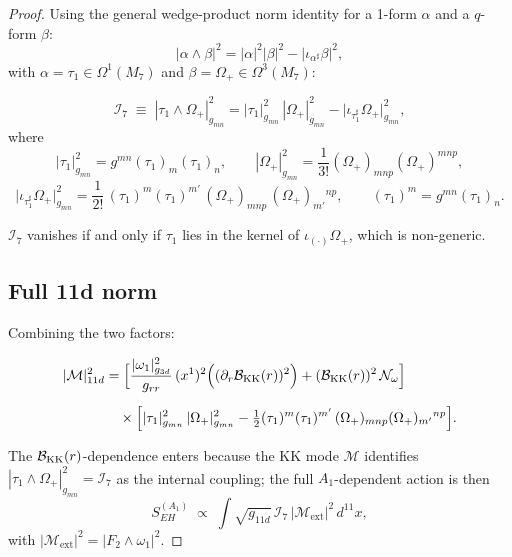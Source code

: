 \documentclass[a4paper,11pt,fleqn]{article}
\theoremstyle{plain}
\theoremstyle{definition}
\newcommand{\ta}{\tau}
\newcommand{\Nf}{{\cal B}_{\rm KK}(r)}
\newcommand{\gone}{g_{11d}}
\newcommand{\grr}{g_{rr}}
\newcommand{\iot}[1]{\iota_{#1}}
\newcommand{\Ical}{\mathcal{I}_7}
\begin{document}
\begin{proof}
\noindent
Using the general wedge-product norm identity for a 1-form $\alpha$
and a $q$-form $\beta$:
\[
  |\alpha\wedge\beta|^2 = |\alpha|^2|\beta|^2 - |\iot{\alpha^\sharp}\beta|^2,
\]
with $\alpha=\ta_1\in\Omega^1(M_7)$ and $\beta=\Omega_+\in\Omega^3(M_7)$:

\[
  \Ical
  \;\equiv\;
  |\ta_1\wedge\Omega_+|^2_{g_{mn}}
  = |\ta_1|^2_{g_{mn}}\,|\Omega_+|^2_{g_{mn}}
  - \bigl|\iot{\ta_1^\sharp}\Omega_+\bigr|^2_{g_{mn}},
\]
where
\[
  |\ta_1|^2_{g_{mn}} = g^{mn}(\ta_1)_m(\ta_1)_n,
  \qquad
  |\Omega_+|^2_{g_{mn}} = \frac{1}{3!}(\Omega_+)_{mnp}(\Omega_+)^{mnp},
\]
\[
  \bigl|\iot{\ta_1^\sharp}\Omega_+\bigr|^2_{g_{mn}}
  = \frac{1}{2!}\,(\ta_1)^m(\ta_1)^{m'}\,
    (\Omega_+)_{mnp}\,(\Omega_+)_{m'}{}^{np},
  \qquad
  (\ta_1)^m = g^{mn}(\ta_1)_n.
\]

\noindent
$\Ical$ vanishes if and only if $\ta_1$ lies in the kernel of
$\iot{(\cdot)}\Omega_+$, which is non-generic.

\subsection*{Full 11d norm}

Combining the two factors:

\begin{align}
  |\mathcal{M}|^2_{11d}
  &=
  \Bigl[
    \frac{|\omega_1|^2_{g_{3d}}}{\grr}\,(x^1)^2
    \Bigl(
      (\partial_r\Nf)^2    \Bigr)
    + (\Nf)^2\,\mathcal{N}_\omega
  \Bigr]
  \nonumber\\[6pt]
  &\quad\times
  \Bigl[
    |\ta_1|^2_{g_{mn}}\,|\Omega_+|^2_{g_{mn}}
    - \tfrac{1}{2}(\ta_1)^m(\ta_1)^{m'}\,(\Omega_+)_{mnp}(\Omega_+)_{m'}{}^{np}
  \Bigr].
  \label{eq:fullnorm}
\end{align}


The ${\cal B}_{\rm KK}(r)$-dependence enters because the KK mode $\mathcal{M}$ identifies
$|\ta_1\wedge\Omega_+|^2_{g_{mn}} = \Ical$ as the internal coupling;
the full $A_1$-dependent action is then
\[
  S_{EH}^{(A_1)}
  \;\propto\;
  \int\sqrt{\gone}\,\Ical\,|\mathcal{M}_{\mathrm{ext}}|^2\,d^{11}x,
\]
with $|\mathcal{M}_{\mathrm{ext}}|^2 = |F_2\wedge\omega_1|^2$.


\end{proof}
\end{document}
